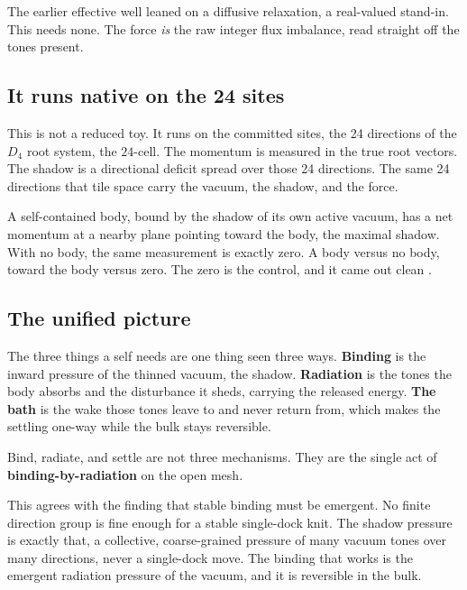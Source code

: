 The earlier effective well leaned on a diffusive relaxation, a real-valued stand-in. This needs none. The force \emph{is} the raw integer flux imbalance, read straight off the tones present.

\subsection{It runs native on the 24 sites}

This is not a reduced toy. It runs on the committed sites, the 24 directions of the $D_4$ root system, the $24$-cell. The momentum is measured in the true root vectors. The shadow is a directional deficit spread over those 24 directions. The same 24 directions that tile space carry the vacuum, the shadow, and the force.

\begin{result}
A self-contained body, bound by the shadow of its own active vacuum, has a net momentum at a nearby plane pointing toward the body, the maximal shadow. With no body, the same measurement is exactly zero. A body versus no body, toward the body versus zero. The zero is the control, and it came out clean \cite{pollard2026vibetest}.
\end{result}

\subsection{The unified picture}

The three things a self needs are one thing seen three ways. \textbf{Binding} is the inward pressure of the thinned vacuum, the shadow. \textbf{Radiation} is the tones the body absorbs and the disturbance it sheds, carrying the released energy. \textbf{The bath} is the wake those tones leave to and never return from, which makes the settling one-way while the bulk stays reversible.

\begin{principle}
Bind, radiate, and settle are not three mechanisms. They are the single act of \textbf{binding-by-radiation} on the open mesh.
\end{principle}

This agrees with the finding that stable binding must be emergent. No finite direction group is fine enough for a stable single-dock knit. The shadow pressure is exactly that, a collective, coarse-grained pressure of many vacuum tones over many directions, never a single-dock move. The binding that works is the emergent radiation pressure of the vacuum, and it is reversible in the bulk.

